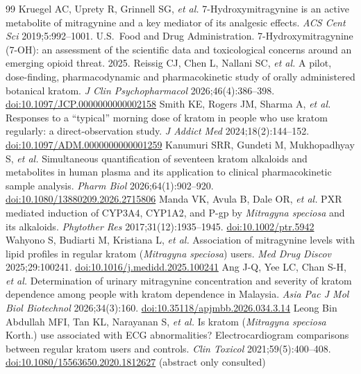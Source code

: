 \documentclass[10pt,a4paper]{article}
\begin{document}
\begin{thebibliography}{99}
 Kruegel AC, Uprety R, Grinnell SG, \emph{et al.} 7-Hydroxymitragynine is an active metabolite of mitragynine
and a key mediator of its analgesic effects. \emph{ACS Cent Sci} 2019;5:992--1001.
 U.S.\ Food and Drug Administration. 7-Hydroxymitragynine (7-OH): an assessment of the scientific data and
toxicological concerns around an emerging opioid threat. 2025.
 Reissig CJ, Chen L, Nallani SC, \emph{et al.} A pilot, dose-finding, pharmacodynamic and pharmacokinetic study of
orally administered botanical kratom. \emph{J Clin Psychopharmacol} 2026;46(4):386--398.
\href{https://doi.org/10.1097/JCP.0000000000002158}{doi:10.1097/JCP.0000000000002158}
 Smith KE, Rogers JM, Sharma A, \emph{et al.} Responses to a ``typical'' morning dose of kratom in people who use kratom
regularly: a direct-observation study. \emph{J Addict Med} 2024;18(2):144--152.
\href{https://doi.org/10.1097/ADM.0000000000001259}{doi:10.1097/ADM.0000000000001259}
 Kanumuri SRR, Gundeti M, Mukhopadhyay S, \emph{et al.} Simultaneous quantification of seventeen kratom alkaloids and
metabolites in human plasma and its application to clinical pharmacokinetic sample analysis. \emph{Pharm Biol} 2026;64(1):902--920.
\href{https://doi.org/10.1080/13880209.2026.2715806}{doi:10.1080/13880209.2026.2715806}
 Manda VK, Avula B, Dale OR, \emph{et al.} PXR mediated induction of CYP3A4, CYP1A2, and P-gp by \emph{Mitragyna speciosa}
and its alkaloids. \emph{Phytother Res} 2017;31(12):1935--1945. \href{https://doi.org/10.1002/ptr.5942}{doi:10.1002/ptr.5942}
 Wahyono S, Budiarti M, Kristiana L, \emph{et al.} Association of mitragynine levels with lipid profiles in regular kratom
(\emph{Mitragyna speciosa}) users. \emph{Med Drug Discov} 2025;29:100241.
\href{https://doi.org/10.1016/j.medidd.2025.100241}{doi:10.1016/j.medidd.2025.100241}
 Ang J-Q, Yee LC, Chan S-H, \emph{et al.} Determination of urinary mitragynine concentration and severity of kratom dependence
among people with kratom dependence in Malaysia. \emph{Asia Pac J Mol Biol Biotechnol} 2026;34(3):160.
\href{https://doi.org/10.35118/apjmbb.2026.034.3.14}{doi:10.35118/apjmbb.2026.034.3.14}
 Leong Bin Abdullah MFI, Tan KL, Narayanan S, \emph{et al.} Is kratom (\emph{Mitragyna speciosa} Korth.) use associated with
ECG abnormalities? Electrocardiogram comparisons between regular kratom users and controls. \emph{Clin Toxicol} 2021;59(5):400--408.
\href{https://doi.org/10.1080/15563650.2020.1812627}{doi:10.1080/15563650.2020.1812627} (abstract only consulted)

\end{thebibliography}
\end{document}
